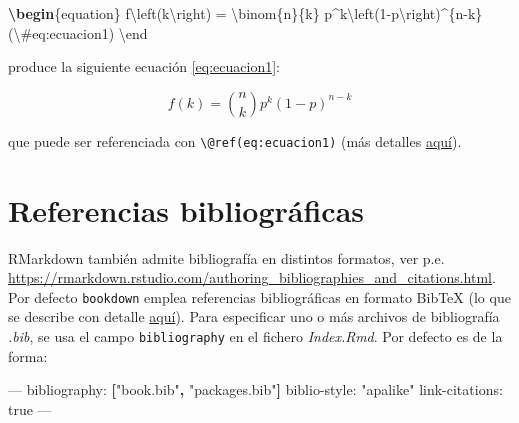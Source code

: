 \documentclass[]{book}
\newenvironment{Shaded}{\begin{snugshade}}{\end{snugshade}}
\newcommand{\KeywordTok}[1]{\textcolor[rgb]{0.13,0.29,0.53}{\textbf{#1}}}
\newcommand{\SpecialCharTok}[1]{\textcolor[rgb]{0.00,0.00,0.00}{#1}}
\newcommand{\StringTok}[1]{\textcolor[rgb]{0.31,0.60,0.02}{#1}}
\newcommand{\SpecialStringTok}[1]{\textcolor[rgb]{0.31,0.60,0.02}{#1}}
\newcommand{\OtherTok}[1]{\textcolor[rgb]{0.56,0.35,0.01}{#1}}
\newcommand{\FunctionTok}[1]{\textcolor[rgb]{0.00,0.00,0.00}{#1}}
\newcommand{\ExtensionTok}[1]{#1}
\newcommand{\AttributeTok}[1]{\textcolor[rgb]{0.77,0.63,0.00}{#1}}
\newcommand{\NormalTok}[1]{#1}
\theoremstyle{definition}
\theoremstyle{definition}
\theoremstyle{definition}
\theoremstyle{remark}
\begin{document}
\begin{Shaded}
\begin{Highlighting}[]
\KeywordTok{\textbackslash{}begin}\NormalTok{\{}\ExtensionTok{equation}\NormalTok{\}}\SpecialStringTok{ }
\SpecialStringTok{  f}\SpecialCharTok{\textbackslash{}left}\SpecialStringTok{(k}\SpecialCharTok{\textbackslash{}right}\SpecialStringTok{) = }\SpecialCharTok{\textbackslash{}binom}\SpecialStringTok{\{n\}\{k\} p^k}\SpecialCharTok{\textbackslash{}left}\SpecialStringTok{(1-p}\SpecialCharTok{\textbackslash{}right}\SpecialStringTok{)^\{n-k\}}
\SpecialStringTok{  (}\SpecialCharTok{\textbackslash{}#}\SpecialStringTok{eq:ecuacion1)}
\SpecialCharTok{\textbackslash{}end}
\end{Highlighting}
\end{Shaded}

produce la siguiente ecuación \eqref{eq:ecuacion1}:

\begin{equation}
f\left(k\right)=\binom{n}{k}p^k\left(1-p\right)^{n-k} \label{eq:ecuacion1}
\end{equation}

que puede ser referenciada con
\texttt{\textbackslash{}@ref(eq:ecuacion1)} (más detalles
\href{https://bookdown.org/yihui/bookdown/markdown-extensions-by-bookdown.html\#equations}{aquí}).

\section{Referencias bibliográficas}\label{biblio}

RMarkdown también admite bibliografía en distintos formatos, ver p.e.
\url{https://rmarkdown.rstudio.com/authoring_bibliographies_and_citations.html}.
Por defecto \texttt{bookdown} emplea referencias bibliográficas en
formato BibTeX (lo que se describe con detalle
\href{https://bookdown.org/yihui/bookdown/citations.html}{aquí}). Para
especificar uno o más archivos de bibliografía \emph{.bib}, se usa el
campo \texttt{bibliography} en el fichero \emph{Index.Rmd}. Por defecto
es de la forma:

\begin{Shaded}
\begin{Highlighting}[]
\OtherTok{---}
\FunctionTok{bibliography:}\AttributeTok{ }\KeywordTok{[}\StringTok{"book.bib"}\KeywordTok{,} \StringTok{"packages.bib"}\KeywordTok{]}
\FunctionTok{biblio-style:}\AttributeTok{ }\StringTok{"apalike"}
\FunctionTok{link-citations:}\AttributeTok{ true}
\OtherTok{---}
\end{Highlighting}
\end{Shaded}
\end{document}
